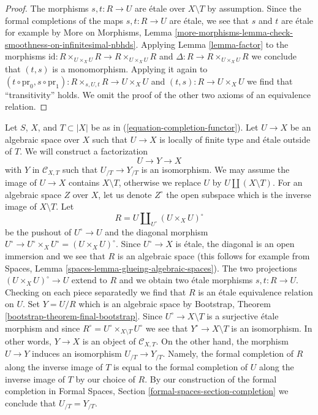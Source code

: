 \begin{proof}
The morphisms $s, t : R \to U$ are \'etale over $X \setminus T$
by assumption. Since the formal completions of the maps
$s, t : R \to U$ are \'etale, we see that $s$ and $t$ are \'etale
for example by More on Morphisms, Lemma
\ref{more-morphisms-lemma-check-smoothness-on-infinitesimal-nbhds}.
Applying Lemma \ref{lemma-factor} to the morphisms
$\text{id} : R \times_{U \times_X U} R \to R \times_{U \times_X U} R$
and $\Delta : R \to R \times_{U \times_X U} R$ we conclude that
$(t, s)$ is a monomorphism. Applying it again to
$(t \circ \text{pr}_0, s \circ \text{pr}_1) :
R \times_{s, U, t} R \to U \times_X U$ and $(t, s) : R \to U \times_X U$
we find that ``transitivity'' holds. We omit the proof of
the other two axioms of an equivalence relation.
\end{proof}

\begin{remark}
\label{remark-smash-away-from-T}
Let $S$, $X$, and $T \subset |X|$ be as in (\ref{equation-completion-functor}).
Let $U \to X$ be an algebraic space over $X$ such that $U \to X$ is
locally of finite type and \'etale outside of $T$. We will construct a
factorization
$$
U \longrightarrow Y \longrightarrow X
$$
with $Y$ in $\mathcal{C}_{X, T}$ such that $U_{/T} \to Y_{/T}$ is an
isomorphism. We may assume the image of $U \to X$ contains
$X \setminus T$, otherwise we replace $U$ by $U \amalg (X \setminus T)$.
For an algebraic space $Z$ over $X$, let us denote $Z^\circ$
the open subspace which is the inverse image of $X \setminus T$.
Let
$$
R = U \amalg_{U^\circ} (U \times_X U)^\circ
$$
be the pushout of $U^\circ \to U$ and the diagonal morphism
$U^\circ \to U^\circ \times_X U^\circ = (U \times_X U)^\circ$.
Since $U^\circ \to X$ is \'etale, the diagonal is an open immersion
and we see that $R$ is an algebraic space (this follows for example
from Spaces, Lemma \ref{spaces-lemma-glueing-algebraic-spaces}).
The two projections $(U \times_X U)^\circ \to U$ extend to $R$
and we obtain two \'etale morphisms $s, t : R \to U$. Checking on each
piece separatedly we find that $R$ is an \'etale equivalence
relation on $U$. Set $Y = U/R$ which is an algebraic space by
Bootstrap, Theorem \ref{bootstrap-theorem-final-bootstrap}.
Since $U^\circ \to X \setminus T$ is a surjective \'etale morphism
and since $R^\circ = U^\circ \times_{X \setminus T} U^\circ$
we see that $Y^\circ \to X \setminus T$ is an isomorphism.
In other words, $Y \to X$ is an object of $\mathcal{C}_{X, T}$.
On the other hand, the morphism $U \to Y$ induces an isomorphism
$U_{/T} \to Y_{/T}$. Namely, the formal completion of $R$
along the inverse image of $T$ is equal to the formal completion of
$U$ along the inverse image of $T$ by our choice of $R$. By
our construction of the formal completion in
Formal Spaces, Section \ref{formal-spaces-section-completion}
we conclude that $U_{/T} = Y_{/T}$.
\end{remark}

